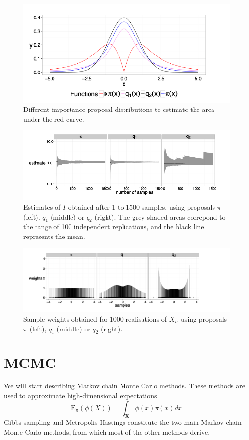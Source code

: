\documentclass{article}
\begin{document}
\begin{figure}
    \centering
    \includegraphics[width=0.75\linewidth]{ox-hilary//simulation-methods//figures/NIS_dist.png}
    \caption{Different importance proposal distributions to estimate the area under the red curve.  
}
    \label{fig:nis_dist}
\end{figure}
\begin{figure}
    \centering
    \includegraphics[width=0.75\linewidth]{ox-hilary//simulation-methods//figures/NIS_burn_in.png}
    \caption{Estimates of $I$ obtained after 1 to 1500 samples, using proposals $\pi$ (left), $q_1$ (middle) or $q_2$ (right). The grey shaded areas correpond to the range of 100 independent replications, and the black line represents the mean.}
    \label{fig:nis_burn_in}
\end{figure}
\begin{figure}
    \centering
    \includegraphics[width=0.75\linewidth]{ox-hilary//simulation-methods//figures/NIS_weights.png}
    \caption{Sample weights obtained for 1000 realisations of $X_i$, using proposals $\pi$ (left), $q_1$ (middle) or $q_2$ (right).}
    \label{fig:nis_weights}
\end{figure}

\section{MCMC}
We will start describing Markov chain Monte Carlo methods. These methods are used to approximate high-dimensional expectations
$$
\mathrm{E}_\pi(\phi(X))=\int_{\mathbf{X}} \phi(x) \pi(x) d x
$$
Gibbs sampling and Metropolis-Hastings constitute the two main Markov chain Monte Carlo methods, from which most of the other methods derive. 
\end{document}
